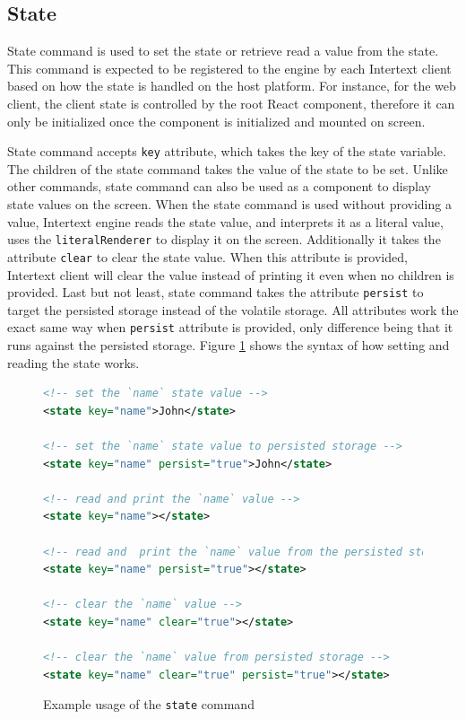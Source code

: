 \subsection{State}

State command is used to set the state or retrieve read a value from the state. This command is expected to be registered to the engine by each Intertext client based on how the state is handled on the host platform. For instance, for the web client, the client state is controlled by the root React component, therefore it can only be initialized once the component is initialized and mounted on screen. 

State command accepts \texttt{key} attribute, which takes the key of the state variable. The children of the state command takes the value of the state to be set. Unlike other commands, state command can also be used as a component to display state values on the screen. When the state command is used without providing a value, Intertext engine reads the state value, and interprets it as a literal value, uses the \texttt{literalRenderer} to display it on the screen. Additionally it takes the attribute \texttt{clear} to clear the state value. When this attribute is provided, Intertext client will clear the value instead of printing it even when no children is provided. Last but not least, state command takes the attribute \texttt{persist} to target the persisted storage instead of the volatile storage. All attributes work the exact same way when \texttt{persist} attribute is provided, only difference being that it runs against the persisted storage. Figure \ref{fig:how_state_is_set_and_read} shows the syntax of how setting and reading the state works.

\begin{figure}
\begin{minipage}{\linewidth}
\begin{lstlisting}[language=xml]
<!-- set the `name` state value -->
<state key="name">John</state>

<!-- set the `name` state value to persisted storage -->
<state key="name" persist="true">John</state>

<!-- read and print the `name` value -->
<state key="name"></state>

<!-- read and  print the `name` value from the persisted storage -->
<state key="name" persist="true"></state>

<!-- clear the `name` value -->
<state key="name" clear="true"></state>

<!-- clear the `name` value from persisted storage -->
<state key="name" clear="true" persist="true"></state>
\end{lstlisting}

\end{minipage}
\caption{Example usage of the \texttt{state} command}%
\label{fig:how_state_is_set_and_read}%
\end{figure}

